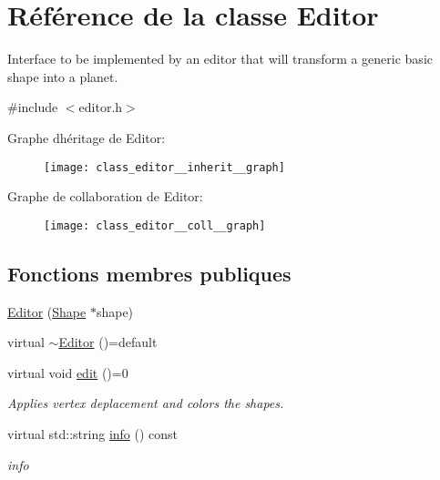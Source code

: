 \hypertarget{class_editor}{}\section{Référence de la classe Editor}
\label{class_editor}


Interface to be implemented by an editor that will transform a generic basic shape into a planet.  




{\ttfamily \#include $<$editor.\+h$>$}



Graphe d\textquotesingle{}héritage de Editor\+:
\nopagebreak
\begin{figure}[H]
\begin{center}
\leavevmode
\texttt{[image: class\_editor\_\_inherit\_\_graph]}
\end{center}
\end{figure}


Graphe de collaboration de Editor\+:\nopagebreak
\begin{figure}[H]
\begin{center}
\leavevmode
\texttt{[image: class\_editor\_\_coll\_\_graph]}
\end{center}
\end{figure}
\subsection*{Fonctions membres publiques}
\begin{DoxyCompactItemize}
\item 
\hyperlink{class_editor_aea7f803e3bbb79dbbeb9a9ad9b01ed5a}{Editor} (\hyperlink{class_shape}{Shape} $\ast$shape)
\item 
virtual \hyperlink{class_editor_a192c911dff4ebca89d0b1bb3aa482253}{$\sim$\+Editor} ()=default
\item 
virtual void \hyperlink{class_editor_abca97ba11536c494a0c26bac77917792}{edit} ()=0
\begin{DoxyCompactList}\small\item\em Applies vertex deplacement and colors the shapes. \end{DoxyCompactList}\item 
virtual std\+::string \hyperlink{class_editor_a5747cd74b71d67f6d39b094071058382}{info} () const
\begin{DoxyCompactList}\small\item\em info \end{DoxyCompactList}\end{DoxyCompactItemize}
